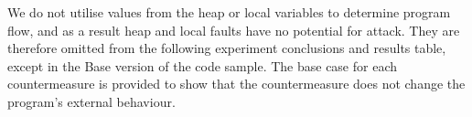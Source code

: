 \noindent We do not utilise values from the heap or local variables to determine program flow, and as a result heap and local faults have no potential for attack. They are therefore omitted from the following experiment conclusions and results table, except in the Base version of the code sample. The base case for each countermeasure is provided to show that the countermeasure does not change the program's external behaviour.


